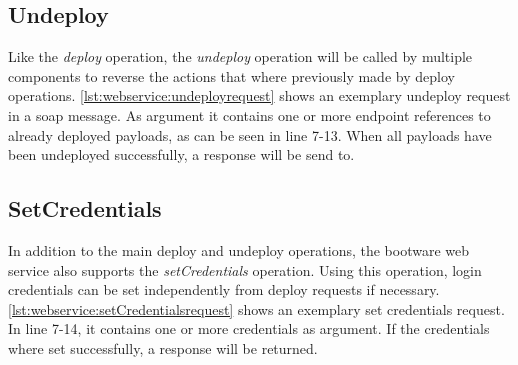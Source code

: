 \subsection{Undeploy}

Like the \textit{deploy} operation, the \textit{undeploy} operation will be called by multiple components to reverse the actions that where previously made by deploy operations.
\autoref{lst:webservice:undeployrequest} shows an exemplary undeploy request in a soap message.
As argument it contains one or more endpoint references to already deployed payloads, as can be seen in line 7-13.
When all payloads have been undeployed successfully, a response will be send to.

\vspace*{\baselineskip}

\subsection{SetCredentials}

In addition to the main deploy and undeploy operations, the bootware web service also supports the \textit{setCredentials} operation.
Using this operation, login credentials can be set independently from deploy requests if necessary.
\autoref{lst:webservice:setCredentialsrequest} shows an exemplary set credentials request.
In line 7-14, it contains one or more credentials as argument.
If the credentials where set successfully, a response will be returned.

\vspace*{\baselineskip}
